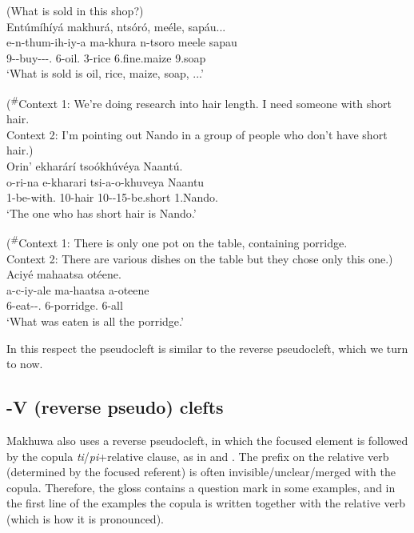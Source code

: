 \documentclass[output=paper]{langscibook}
\begin{document}
\ea
\label{bkm:Ref110409947}
(What is sold in this shop?)\\
Entúmíhíyá makhurá, ntsóró, meéle, sapáu...\\
\gll
e-n-thum-ih-iy-a  ma-khura  n-tsoro  meele  sapau\\
9-\PRS{}-buy-\CAUS{}-\PASS{}-\FV{}.\REL{}  6-oil.\PRL{}  3-rice  6.fine.maize  9.soap\\
\glt
‘What is sold is oil, rice, maize, soap, ...’\\


\z

\ea
\label{bkm:Ref129268576}
(\textsuperscript{\#}Context 1: We’re doing research into hair length. I need someone with short hair.\\
Context 2: I’m pointing out Nando in a group of people who don’t have short hair.)\\
Orin’ ekharárí tsoókhúvéya Naantú.\\
\gll
o-ri-na  e-kharari  tsi-a-o-khuveya  Naantu\\
1-be-with.\REL{}  10-hair  10-\CONN{}-15-be.short  1.Nando.\PRL{}\\
\glt
‘The one who has short hair is Nando.’

\z

\ea
\label{bkm:Ref110410194}
(\textsuperscript{\#}Context 1: There is only one pot on the table, containing porridge.\\
Context 2: There are various dishes on the table but they chose only this one.)\\
Aciyé mahaatsa otéene.\\
\gll
a-c-iy-ale  ma{}-haatsa  a-oteene\\
6-eat-\PASS{}-\PFV{}.\REL{}  6{}-porridge.\PRL{}  6-all\\
\glt
‘What was eaten is all the porridge.’

\z

In this respect the pseudocleft is similar to the reverse pseudocleft, which we turn to now.

\subsection{\COP{}-V (reverse pseudo) clefts}
\label{bkm:Ref110335230}
Makhuwa also uses a reverse pseudocleft, in which the focused element is followed by the copula \textit{ti}/\textit{pi}+relative clause, as in  and . The prefix on the relative verb (determined by the focused referent) is often invisible\slash unclear\slash merged with the copula. Therefore, the gloss contains a question mark in some examples, and in the first line of the examples the copula is written together with the relative verb (which is how it is pronounced).
\end{document}
